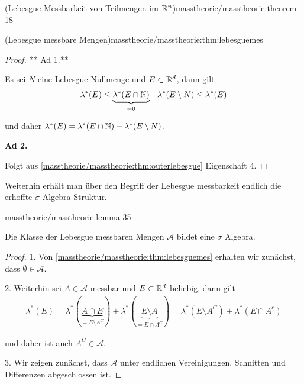 \begin{theorem}{(Lebesgue Messbarkeit von Teilmengen im \protect\(\mathbb{R}^n\protect\))}{masstheorie/masstheorie:theorem-18}
\begin{lemma}{(Lebesgue messbare Mengen)}{masstheorie/masstheorie:thm:lebesguemes}
\begin{enumerate}
\end{enumerate}
\end{lemma}

\begin{proof}
 ** Ad 1.**

\par
Es sei \(N\) eine Lebesgue Nullmenge und \(E\subset\mathbb{R}^d\), dann gilt
\begin{align*}
\lambda^\ast(E) \leq \underbrace{\lambda^\ast(E\cap\mathbb{N})}_{=0} + \lambda^\ast(E\setminus N)\leq
 \lambda^\ast(E)
\end{align*}
\par
und daher \(\lambda^\ast(E) = \lambda^\ast(E\cap\mathbb{N}) + \lambda^\ast(E\setminus N)\).

\par
\textbf{Ad 2.}

\par
Folgt aus \cref{masstheorie/masstheorie:thm:outerlebesgue} Eigenschaft 4.
\end{proof}

\par
Weiterhin erhält man über den Begriff der Lebesgue messbarkeit endlich die erhoffte \(\sigma\) Algebra Struktur.
\begin{lemma}{}{masstheorie/masstheorie:lemma-35}



\par
Die Klasse der Lebesgue messbaren Mengen \(\mathcal{A}\) bildet eine \(\sigma\) Algebra.
\end{lemma}

\begin{proof}
 1. Von \cref{masstheorie/masstheorie:thm:lebesguemes} erhalten wir zunächst, dass \(\emptyset\in\mathcal{A}\).

\par
2. Weiterhin sei \(A\in\mathcal{A}\) messbar und \(E\subset\mathbb{R}^d\) beliebig, dann gilt
\begin{align*}
\lambda^\ast(E) = \lambda^\ast(\underbrace{A\cap E}_{=E\setminus A^C}) + \lambda^\ast(\underbrace{E\setminus A}_{=E\cap A^C}) = 
\lambda^\ast(E\setminus A^C) + \lambda^\ast(E\cap A^c)\end{align*}
\par
und daher ist auch \(A^C\in\mathcal{A}\).

\par
3. Wir zeigen zunächst, dass \(\mathcal{A}\) unter endlichen Vereinigungen, Schnitten und Differenzen abgeschlossen ist.


\end{proof}
\end{theorem}
